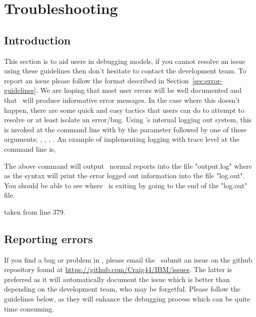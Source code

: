 \section{Troubleshooting\label{sec:trouble-shooting}}

\subsection{Introduction}
This section is to aid users in debugging models, if you cannot resolve an issue using these guidelines then don't hesitate to contact the development team. To report an issue please follow the format described in Section~\ref{sec:error-guidelines}. We are hoping that most user errors will be well documented and that \IBM\ will produce informative error messages. In the case where this doesn't happen, there are some quick and easy tactics that users can do to attempt to resolve or at least isolate an error/bug. Using \IBM's internal logging out system, this is invoked at the command line with by the  parameter followed by one of these arguments; , , , . An example of implementing logging with trace level at the command line is,


The above command will output \IBM\ normal reports into the file "output.log" where as the  syntax will print the error logged out information into the file "log.out". You should be able to see where \IBM\ is exiting by going to the end of the "log.out" file. 



taken from line 379.


\subsection{Reporting errors\label{sec:reporting-errors}}

If you find a bug or problem in \IBM , please email the \emaillink\  submit an issue on the github repository found at \url{https://github.com/Craig44/IBM/issues}. The latter is preferred as it will automatically document the issue which is better than depending on the development team, who may be forgetful. Please follow the guidelines below, as they will enhance the debugging process which can be quite time consuming.

